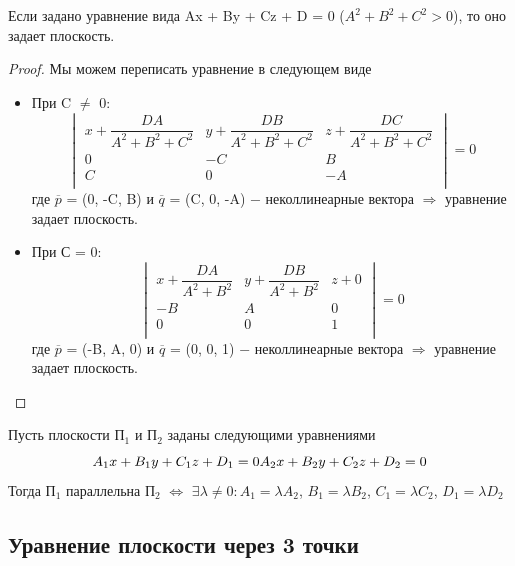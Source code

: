 \begin{corollary}
    Если задано уравнение вида Ax + By + Cz + D = 0 ($A^2 + B^2 + C^2 > 0$), то оно задает плоскость.
\end{corollary}
\begin{proof}
    Мы можем переписать уравнение в следующем виде

    \begin{itemize}
        \item При C $\neq$ 0:
        \[
        \begin{vmatrix}
            x + \dfrac{DA}{A^2 + B^2 + C^2} & y + \dfrac{DB}{A^2 + B^2 + C^2} & z + \dfrac{DC}{A^2 + B^2 + C^2}\\
            0 & -C & B\\
            C & 0 & -A\\
        \end{vmatrix} = 0
        \]
        где $\overline{p}$ = (0, -C, B) и $\overline{q}$ = (C, 0, -A) $-$ неколлинеарные вектора $\Longrightarrow$ уравнение задает плоскость.

        \item При С = 0:
        \[
        \begin{vmatrix}
            x + \dfrac{DA}{A^2 + B^2} & y + \dfrac{DB}{A^2 + B^2} & z + 0\\
            -B & A & 0\\
            0 & 0 & 1\\
        \end{vmatrix} = 0
        \]
        где $\overline{p}$ = (-B, A, 0) и $\overline{q}$ = (0, 0, 1) $-$ неколлинеарные вектора $\Longrightarrow$ уравнение задает плоскость.
    \end{itemize}
\end{proof}

\begin{theorem}
    Пусть плоскости П$_1$ и П$_2$ заданы следующими уравнениями
    \[
    A_1x + B_1y + C_1z + D_1 = 0\\
    A_2x + B_2y + C_2z + D_2 = 0\\
    \]
    Тогда П$_1$ параллельна П$_2$ $\Longleftrightarrow$ $\exists\lambda\neq 0 : A_1 = \lambda A_2$, $B_1 = \lambda B_2$, $C_1 = \lambda C_2$, $D_1 = \lambda D_2$
\end{theorem}

\subsection{Уравнение плоскости через 3 точки}

